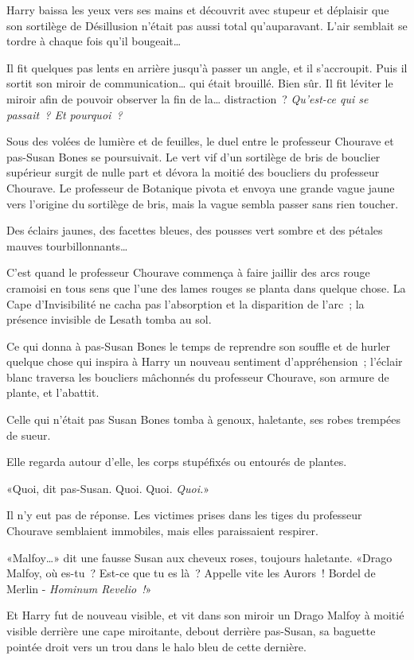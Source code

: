 Harry baissa les yeux vers ses mains et découvrit avec stupeur et déplaisir que son sortilège de Désillusion n'était pas aussi total qu'auparavant. L'air semblait se tordre à chaque fois qu'il bougeait…

Il fit quelques pas lents en arrière jusqu'à passer un angle, et il s'accroupit. Puis il sortit son miroir de communication… qui était brouillé. Bien sûr. Il fit léviter le miroir afin de pouvoir observer la fin de la… distraction~? \emph{Qu'est-ce qui se passait~? Et pourquoi~?}

Sous des volées de lumière et de feuilles, le duel entre le professeur Chourave et pas-Susan Bones se poursuivait. Le vert vif d'un sortilège de bris de bouclier supérieur surgit de nulle part et dévora la moitié des boucliers du professeur Chourave. Le professeur de Botanique pivota et envoya une grande vague jaune vers l'origine du sortilège de bris, mais la vague sembla passer sans rien toucher.

Des éclairs jaunes, des facettes bleues, des pousses vert sombre et des pétales mauves tourbillonnants…

C'est quand le professeur Chourave commença à faire jaillir des arcs rouge cramoisi en tous sens que l'une des lames rouges se planta dans quelque chose. La Cape d'Invisibilité ne cacha pas l'absorption et la disparition de l'arc~; la présence invisible de Lesath tomba au sol.

Ce qui donna à pas-Susan Bones le temps de reprendre son souffle et de hurler quelque chose qui inspira à Harry un nouveau sentiment d'appréhension~; l'éclair blanc traversa les boucliers mâchonnés du professeur Chourave, son armure de plante, et l'abattit.

Celle qui n'était pas Susan Bones tomba à genoux, haletante, ses robes trempées de sueur.

Elle regarda autour d'elle, les corps stupéfixés ou entourés de plantes.

«Quoi, dit pas-Susan. Quoi. Quoi. \emph{Quoi.}»

Il n'y eut pas de réponse. Les victimes prises dans les tiges du professeur Chourave semblaient immobiles, mais elles paraissaient respirer.

«Malfoy…» dit une fausse Susan aux cheveux roses, toujours haletante. «Drago Malfoy, où es-tu~? Est-ce que tu es là~? Appelle vite les Aurors~! Bordel de Merlin - \emph{Hominum Revelio~!}»

Et Harry fut de nouveau visible, et vit dans son miroir un Drago Malfoy à moitié visible derrière une cape miroitante, debout derrière pas-Susan, sa baguette pointée droit vers un trou dans le halo bleu de cette dernière.

